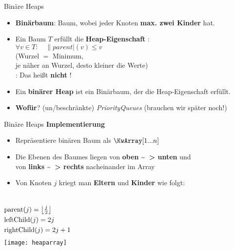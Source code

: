 \begin{frame}{Binäre Heaps}
	\begin{itemize}
		\item \textbf{Binärbaum}: Baum, wobei jeder Knoten \textbf{max. zwei Kinder} hat.
		\pause
		\item Ein Baum $T$ erfüllt die \textbf{Heap-Eigenschaft} :\gdw \\ 
		$\forall v \in T : \quad \|parent|(v) \leq v$ \\ \smallskip
		{\small (Wurzel $=$ Minimum, \\
			je näher an Wurzel, desto kleiner die Werte) } \\ \smallskip
		: Das heißt \textbf{nicht} !
		\pause
		\item Ein \textbf{binärer Heap} ist ein Binärbaum, der die Heap-Eigenschaft erfüllt.
		\pause
		\item \textbf{Wofür}? \impl (un/beschränkte) \textit{PriorityQueues}  {\small (brauchen wir später noch!)}
	\end{itemize}
\end{frame}

\begin{frame}{Binäre Heaps}
	\textbf{Implementierung} \\
	\begin{itemize}
		\item Repräsentiere binären Baum als $\KwArray[1...n]$ 
		\item Die Ebenen des Baumes liegen von \textbf{oben \~~> unten} und \\ von \textbf{links \~~> rechts} nacheinander im Array 
		\pause
		\item Von Knoten $j$ kriegt man \textbf{Eltern} und \textbf{Kinder} wie folgt:
	\end{itemize}
	\begin{columns}
			\vspace{-7\baselineskip} %
			\begin{align*}
				&\|parent|(j) = \floor{\tfrac{j}{2}} \\
				&\|leftChild|(j) = 2j \\
				&\|rightChild|(j) = 2j + 1
			\end{align*}
			\texttt{[image: heaparray]}
	\end{columns}
\end{frame}

